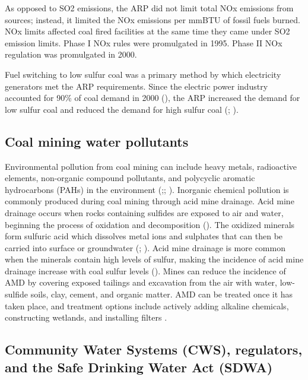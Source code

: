 \documentclass{article}
\begin{document}
As opposed to SO2 emissions, the ARP did not limit total NOx emissions from sources; instead, it limited the NOx emissions per mmBTU of fossil fuels burned. NOx limits affected coal fired facilities at the same time they came under SO2 emission limits. Phase I NOx rules were promulgated in 1995. Phase II NOx regulation was promulgated in 2000.

Fuel switching to low sulfur coal was a primary method by which electricity generators met the ARP requirements. Since the electric power industry accounted for 90\% of coal demand in 2000 (\cite{freme2000us}), the ARP increased the demand for low sulfur coal and reduced the demand for high sulfur coal (\cite{epaarpcoalemp}; \cite{stratford2015coalprod}). 

\subsection{Coal mining water pollutants}

Environmental pollution from coal mining can include heavy metals, radioactive elements, non-organic compound pollutants, and polycyclic aromatic hydrocarbons (PAHs) in the environment (\cite{rouhani2023overview};\cite{boente2020benzo}; \cite{liang2017spatial}). Inorganic chemical pollution is commonly produced during coal mining through acid mine drainage. Acid mine drainage occurs when rocks containing sulfides are exposed to air and water, beginning the process of oxidation and decomposition (\cite{ceto2000abandoned}). The oxidized minerals form sulfuric acid which dissolves metal ions and sulphates that can then be carried into surface or groundwater (\cite{akcil2006acid}; \cite{skousen2019acid}). Acid mine drainage is more common when the minerals contain high levels of sulfur, making the incidence of acid mine drainage increase with coal sulfur levels (\cite{schweinfurth2009introduction}). Mines can reduce the incidence of AMD by covering exposed tailings and excavation from the air with water, low-sulfide soils, clay, cement, and organic matter. AMD can be treated once it has taken place, and treatment options include actively adding alkaline chemicals, constructing wetlands, and installing filters \cite{KEFENI2017475}.

\subsection{Community Water Systems (CWS), regulators, and the Safe Drinking Water Act (SDWA)}
\end{document}
